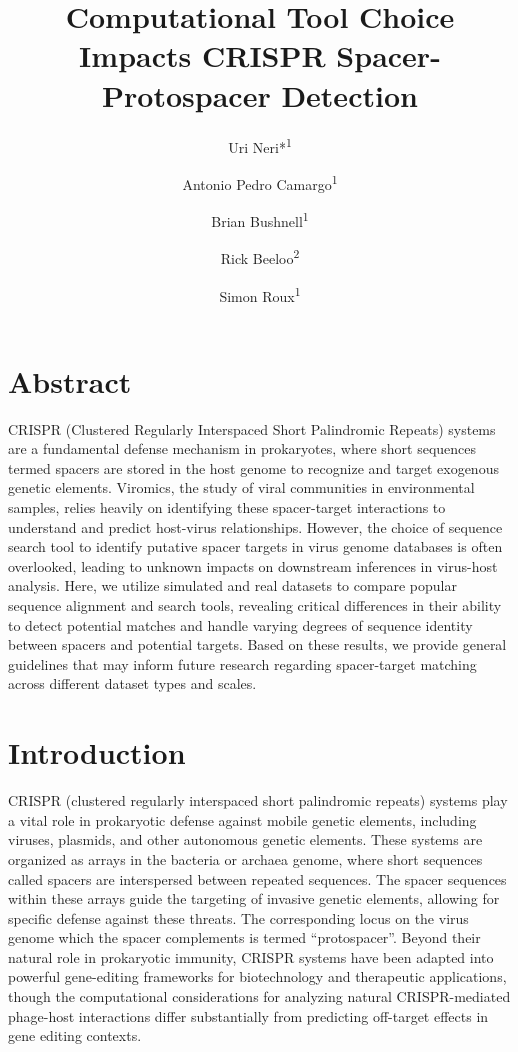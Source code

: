 \documentclass[
]{article}
\title{Computational Tool Choice Impacts CRISPR Spacer-Protospacer
Detection}
\author{Uri Neri*\textsuperscript{1} \and Antonio Pedro
Camargo\textsuperscript{1} \and Brian
Bushnell\textsuperscript{1} \and Rick
Beeloo\textsuperscript{2} \and Simon Roux\textsuperscript{1}}
\date{}
\begin{document}
\maketitle


\section{Abstract}\label{sec-abstract}

CRISPR (Clustered Regularly Interspaced Short Palindromic Repeats)
systems are a fundamental defense mechanism in prokaryotes, where short
sequences termed spacers are stored in the host genome to recognize and
target exogenous genetic elements. Viromics, the study of viral
communities in environmental samples, relies heavily on identifying
these spacer-target interactions to understand and predict host-virus
relationships. However, the choice of sequence search tool to identify
putative spacer targets in virus genome databases is often overlooked,
leading to unknown impacts on downstream inferences in virus-host
analysis. Here, we utilize simulated and real datasets to compare
popular sequence alignment and search tools, revealing critical
differences in their ability to detect potential matches and handle
varying degrees of sequence identity between spacers and potential
targets. Based on these results, we provide general guidelines that may
inform future research regarding spacer-target matching across different
dataset types and scales.

\section{Introduction}\label{sec-introduction}

CRISPR (clustered regularly interspaced short palindromic repeats)
systems play a vital role in prokaryotic defense against mobile genetic
elements, including viruses, plasmids, and other autonomous genetic
elements\autocite{Mojica_2005,CRISPR_review}. These systems are
organized as arrays in the bacteria or archaea genome, where short
sequences called spacers are interspersed between repeated sequences.
The spacer sequences within these arrays guide the targeting of invasive
genetic elements, allowing for specific defense against these
threats\autocite{CRISPR_classification}. The corresponding locus on the
virus genome which the spacer complements is termed ``protospacer''.
Beyond their natural role in prokaryotic immunity, CRISPR systems have
been adapted into powerful gene-editing frameworks for biotechnology and
therapeutic applications\autocite{CRISPR_gene_editing_review}, though
the computational considerations for analyzing natural CRISPR-mediated
phage-host interactions differ substantially from predicting off-target
effects in gene editing contexts.
\end{document}
